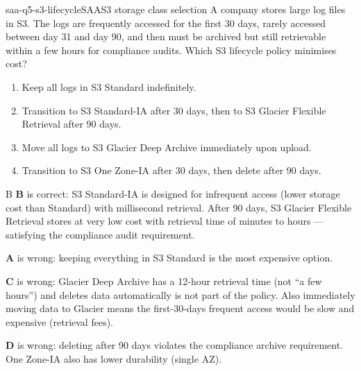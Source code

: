 \begin{question}{saa-q5-s3-lifecycle}{SAA}{S3 storage class selection}
A company stores large log files in S3. The logs are frequently accessed for the first 30 days, rarely accessed between day 31 and day 90, and then must be archived but still retrievable within a few hours for compliance audits. Which S3 lifecycle policy minimises cost?

\begin{enumerate}[label=\Alph*.]
  \item Keep all logs in S3 Standard indefinitely.
  \item Transition to S3 Standard-IA after 30 days, then to S3 Glacier Flexible Retrieval after 90 days.
  \item Move all logs to S3 Glacier Deep Archive immediately upon upload.
  \item Transition to S3 One Zone-IA after 30 days, then delete after 90 days.
\end{enumerate}
\end{question}

\begin{answer}{B}
\textbf{B} is correct: S3 Standard-IA is designed for infrequent access (lower storage cost than Standard) with millisecond retrieval. After 90 days, S3 Glacier Flexible Retrieval stores at very low cost with retrieval time of minutes to hours --- satisfying the compliance audit requirement.

\textbf{A} is wrong: keeping everything in S3 Standard is the most expensive option.

\textbf{C} is wrong: Glacier Deep Archive has a 12-hour retrieval time (not ``a few hours'') and deletes data automatically is not part of the policy. Also immediately moving data to Glacier means the first-30-days frequent access would be slow and expensive (retrieval fees).

\textbf{D} is wrong: deleting after 90 days violates the compliance archive requirement. One Zone-IA also has lower durability (single AZ).
\end{answer}



